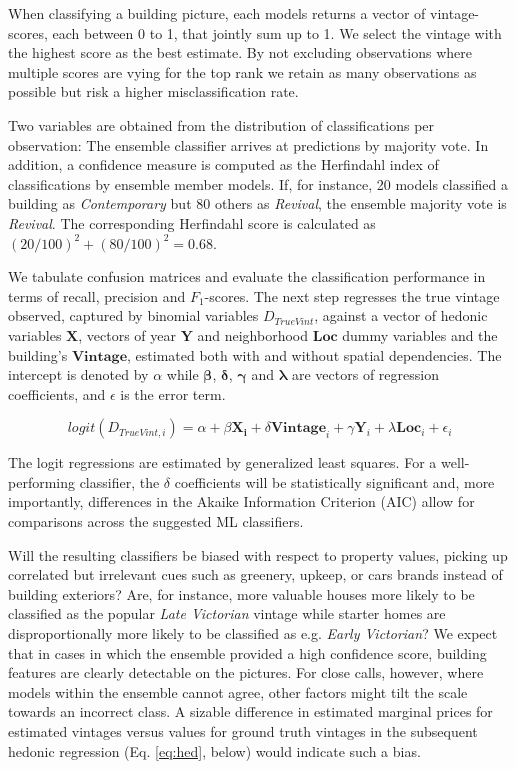 \documentclass[]{article}
\begin{document}
When classifying a building picture, each models returns a vector of
vintage-scores, each between 0 to 1, that jointly sum up to 1. We select
the vintage with the highest score as the best estimate. By not
excluding observations where multiple scores are vying for the top rank
we retain as many observations as possible but risk a higher
misclassification rate.

Two variables are obtained from the distribution of classifications per
observation: The ensemble classifier arrives at predictions by majority
vote. In addition, a confidence measure is computed as the Herfindahl
index of classifications by ensemble member models. If, for instance, 20
models classified a building as \emph{Contemporary} but 80 others as
\emph{Revival}, the ensemble majority vote is \emph{Revival}. The
corresponding Herfindahl score is calculated as
\((20/100)^2 + (80/100)^2 = 0.68\).

We tabulate confusion matrices and evaluate the classification
performance in terms of recall, precision and \(F_1\)-scores. The next
step regresses the true vintage observed, captured by binomial variables
\(D_{TrueVint}\), against a vector of hedonic variables \(\mathbf{X}\),
vectors of year \(\mathbf{Y}\) and neighborhood \(\bm{Loc}\) dummy
variables and the building's \(\mathbf{Vintage}\), estimated both with
and without spatial dependencies. The intercept is denoted by \(\alpha\)
while \(\bm{\beta}\), \(\bm{\delta}\), \(\bm{\gamma}\) and
\(\bm{\lambda}\) are vectors of regression coefficients, and
\(\epsilon\) is the error term.

\begin{equation} \label{eq:rev}
  logit( D_{TrueVint,i} ) = \alpha + \beta\mathbf{X_i} + \delta\mathbf{Vintage}_i +  \gamma\mathbf{Y}_i + \lambda\mathbf{Loc}_i +  \epsilon_i
\end{equation}

The logit regressions are estimated by generalized least squares. For a
well-performing classifier, the \(\delta\) coefficients will be
statistically significant and, more importantly, differences in the
Akaike Information Criterion (AIC) allow for comparisons across the
suggested ML classifiers.

Will the resulting classifiers be biased with respect to property
values, picking up correlated but irrelevant cues such as greenery,
upkeep, or cars brands instead of building exteriors? Are, for instance,
more valuable houses more likely to be classified as the popular
\emph{Late Victorian} vintage while starter homes are disproportionally
more likely to be classified as e.g. \emph{Early Victorian}? We expect
that in cases in which the ensemble provided a high confidence score,
building features are clearly detectable on the pictures. For close
calls, however, where models within the ensemble cannot agree, other
factors might tilt the scale towards an incorrect class. A sizable
difference in estimated marginal prices for estimated vintages versus
values for ground truth vintages in the subsequent hedonic regression
(Eq. \ref{eq:hed}, below) would indicate such a bias.
\end{document}
